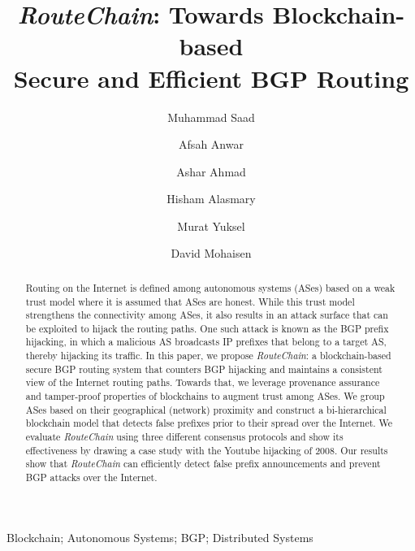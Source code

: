 \documentclass[5p]{elsarticle}
\newcommand{\rc}{{{\em RouteChain}}\xspace}
\begin{document}
\begin{frontmatter}
\title{\rc: Towards Blockchain-based \\Secure and Efficient BGP Routing}
\author[]{Muhammad Saad}
\author[]{Afsah Anwar}
\author[]{Ashar Ahmad}
\author[]{Hisham Alasmary}
\author[]{Murat Yuksel}
\author[]{David Mohaisen}



\address{University of Central Florida}


\begin{abstract}
Routing on the Internet is defined among autonomous systems (ASes) based on a weak trust model where it is assumed that ASes are honest. While this trust model strengthens the connectivity among ASes, it also results in an attack surface that can be exploited to hijack the routing paths. One such attack is known as the BGP prefix hijacking, in which a malicious AS broadcasts IP prefixes that belong to a target AS, thereby hijacking its traffic. In this paper, we propose \rc: a blockchain-based secure BGP routing system that counters BGP hijacking and maintains a consistent view of the Internet routing paths. Towards that, we leverage provenance assurance and tamper-proof properties of blockchains to augment trust among ASes. We group ASes based on their geographical (network) proximity and construct a bi-hierarchical blockchain model that detects false prefixes prior to their spread over the Internet. We evaluate \rc using three different consensus protocols and show its effectiveness by drawing a case study with the Youtube hijacking of 2008. Our results show that \rc can efficiently detect false prefix announcements and prevent BGP attacks over the Internet.    
\end{abstract}

\begin{keyword} Blockchain; Autonomous Systems; BGP; Distributed Systems\end{keyword}
\end{frontmatter}
\end{document}
